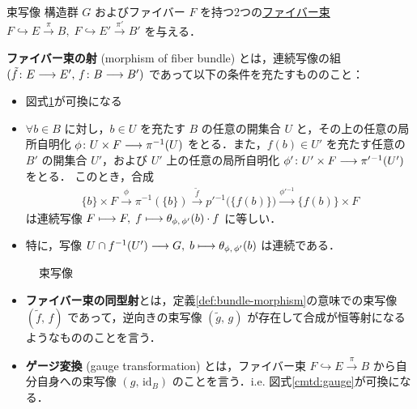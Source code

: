 \documentclass[algtopo_main]{subfiles}
\begin{document}
\begin{mydef}[label=def:bundle-morphism]{束写像}
    構造群 $G$ およびファイバー $F$ を持つ2つの\hyperref[def:FB]{ファイバー束} $F \hookrightarrow E \xrightarrow{\pi} B,\; F \hookrightarrow E' \xrightarrow{\pi'} B'$ を与える．

    \textbf{ファイバー束の射} (morphism of fiber bundle) とは，連続写像の組 $(\tilde{f} \colon E \longrightarrow E',\, f \colon B \longrightarrow B')$ であって以下の条件を充たすもののこと：
    \begin{itemize}
        \item 図式\ref{cmtd:bundle-morphism}が可換になる
        \item $\forall b \in B$ に対し，$b \in U$ を充たす $B$ の任意の開集合 $U$ と，その上の任意の局所自明化 $\phi \colon U \times F \longrightarrow \pi^{-1}(U)$ をとる．また，$f(b) \in U'$ を充たす任意の $B'$ の開集合 $U'$，および $U'$ 上の任意の局所自明化 $\phi' \colon U' \times F \longrightarrow \pi'{}^{-1}(U')$ をとる． このとき，合成
        \begin{align}
            \{b\} \times F \xrightarrow{\phi} \pi^{-1}(\{b\}) \xrightarrow{\tilde{f}} p'{}^{-1} \bigl( \{f(b)\} \bigr) \xrightarrow{\phi'{}^{-1}} \bigl\{ f(b) \bigr\} \times F
        \end{align}
        は連続写像 $F \longmapsto F,\; f \longmapsto \theta_{\phi,\, \phi'} (b) \cdot f$ に等しい．
        \item 特に，写像 $U \cap f^{-1}(U') \longrightarrow G,\; b \longmapsto \theta_{\phi,\, \phi'}(b)$ は連続である．
    \end{itemize}
\end{mydef}

\begin{figure}[H]
    \centering
    \caption{束写像}
    \label{cmtd:bundle-morphism}
\end{figure}%

\begin{itemize}
    \item \textbf{ファイバー束の同型射}とは，定義\ref{def:bundle-morphism}の意味での束写像 $(\tilde{f},\, f)$ であって，逆向きの束写像 $(\tilde{g},\, g)$ が存在して合成が恒等射になるようなもののことを言う．
    \item \textbf{ゲージ変換} (gauge transformation) とは，ファイバー束 $F \hookrightarrow E \xrightarrow{\pi} B$ から自分自身への束写像 $(g,\, \mathrm{id}_B)$ のことを言う．i.e. 図式\ref{cmtd:gauge}が可換になる．
\end{itemize}
\end{document}
